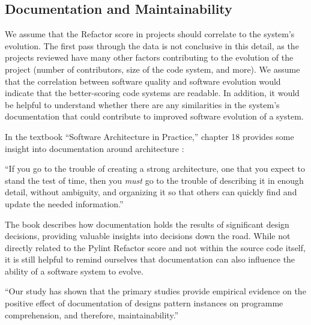 \subsection{Documentation and Maintainability} \label{subDocumentation}


We assume that the Refactor score in projects should correlate to the system's evolution. The first pass through the data is not conclusive in this detail, as the projects reviewed have many other factors contributing to the evolution of the project (number of contributors, size of the code system, and more). We assume that the correlation between software quality and software evolution would indicate that the better-scoring code systems are readable. In addition, it would be helpful to understand whether there are any similarities in the system's documentation that could contribute to improved software evolution of a system.


In the textbook ``Software Architecture in Practice,'' chapter 18 provides some insight into documentation around architecture \cite{book:software-architecture-in-practice}:

\vspace{0.25cm}
\begin{displayquote}
  ``If you go to the trouble of creating a strong architecture, one that you expect to stand the test of time, then you \textit{must} go to the trouble of describing it in enough detail, without ambiguity, and organizing it so that others can quickly find and update the needed information.''
\end{displayquote}
\vspace{0.25cm}

The book describes how documentation holds the results of significant design decisions, providing valuable insights into decisions down the road. While not directly related to the Pylint Refactor score and not within the source code itself, it is still helpful to remind ourselves that documentation can also influence the ability of a software system to evolve.

\vspace{0.25cm}
\begin{displayquote}
  ``Our study has shown that the primary studies provide empirical evidence on the positive effect of documentation of designs pattern instances on programme comprehension, and therefore, maintainability.''
\end{displayquote}

